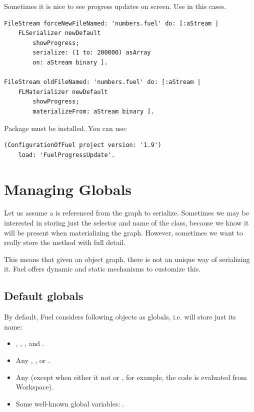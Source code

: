 \documentclass[a4paper,10pt,twoside]{book}
\begin{document}
Sometimes it is nice to see progress updates on screen. Use  in this cases.

\begin{lstlisting}
FileStream forceNewFileNamed: 'numbers.fuel' do: [:aStream |
	FLSerializer newDefault 
		showProgress;
		serialize: (1 to: 200000) asArray 
		on: aStream binary ].
	
FileStream oldFileNamed: 'numbers.fuel' do: [:aStream | 
	FLMaterializer newDefault 
		showProgress;
		materializeFrom: aStream binary ].
\end{lstlisting}

Package  must be installed. You can use:

\begin{lstlisting}
(ConfigurationOfFuel project version: '1.9') 
	load: 'FuelProgressUpdate'.
\end{lstlisting}



\section{Managing Globals}
\label{ManagingGlobals}

Let us assume a  is referenced from the graph to serialize. Sometimes we may be interested in storing just the selector and name of the class, because we know it will be present when materializing the graph. However, sometimes we want to really store the method with full detail.

This means that given an object graph, there is not an unique way of serializing it. Fuel offers dynamic and static mechanisms to customize this.

\subsection{Default globals}

By default, Fuel considers following objects as globals, i.e. will store just its name:

\begin{itemize}
\item  {}, , , and .
\item  Any , ,  or .
\item  Any  (except when either it  not or , for example, the code is evaluated from Workspace).
\item  Some well-known global variables:              .
\end{itemize}
\end{document}
